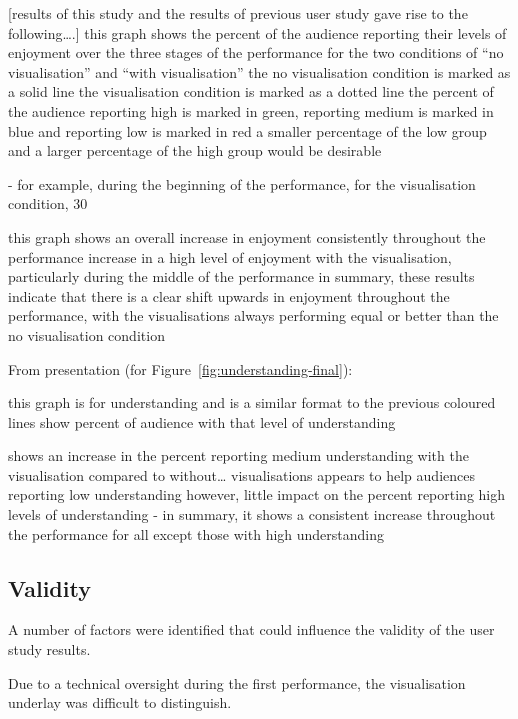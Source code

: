 [results of this study and the results of previous user study gave rise to the following….]
this graph shows the percent of the audience reporting their levels of enjoyment over the three stages of the performance for the two conditions of “no visualisation” and “with visualisation” 
the no visualisation condition is marked as a solid line
the visualisation condition is marked as a dotted line
the percent of the audience reporting high is marked in green, reporting medium is marked in blue and reporting low is marked in red
a smaller percentage of the low group and a larger percentage of the high group would be desirable

- for example, during the beginning of the performance, for the visualisation condition, 30%

this graph shows an overall increase in enjoyment consistently throughout the performance
increase in a high level of enjoyment with the visualisation, particularly during the middle of the performance
in summary, these results indicate that there is a clear shift upwards in enjoyment throughout the performance, with the visualisations always performing equal or better than the no visualisation condition

From presentation (for Figure~\ref{fig:understanding-final}):

this graph is for understanding and is a similar format to the previous
coloured lines show percent of audience with that level of understanding

shows an increase in the percent reporting medium understanding with the visualisation compared to without… 
visualisations appears to help audiences reporting low understanding
however, little impact on the percent reporting high levels of understanding
-  in summary, it shows a consistent increase throughout the performance for all except those with high understanding



\subsection{Validity}

A number of factors were identified that could influence the validity of the user study results.

Due to a technical oversight during the first performance, the visualisation underlay was difficult to distinguish. 

